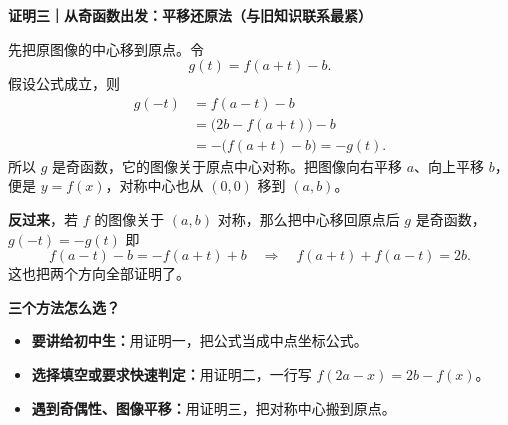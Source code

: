 \begin{proofbox}
\textbf{\textcolor{CProof}{证明三｜从奇函数出发：平移还原法（与旧知识联系最紧）}}



先把原图像的中心移到原点。令
\[
 g(t)=f(a+t)-b.
\]
假设公式成立，则
\[
\begin{aligned}
 g(-t)&=f(a-t)-b\\
      &=\bigl(2b-f(a+t)\bigr)-b\\
      &=-\bigl(f(a+t)-b\bigr)=-g(t).
\end{aligned}
\]
所以 $g$ 是奇函数，它的图像关于原点中心对称。把图像向右平移 $a$、向上平移 $b$，
便是 $y=f(x)$，对称中心也从 $(0,0)$ 移到 $(a,b)$。

\textbf{反过来}，若 $f$ 的图像关于 $(a,b)$ 对称，那么把中心移回原点后 $g$ 是奇函数，
$g(-t)=-g(t)$ 即
\[
 f(a-t)-b=-f(a+t)+b
\quad\Longrightarrow\quad
 f(a+t)+f(a-t)=2b.
\]
这也把两个方向全部证明了。

\medskip
\textbf{\textcolor{CProof}{三个方法怎么选？}}
\begin{itemize}[leftmargin=*,itemsep=0.25em]
\item \textbf{要讲给初中生：}用证明一，把公式当成中点坐标公式。
\item \textbf{选择填空或要求快速判定：}用证明二，一行写 $f(2a-x)=2b-f(x)$。
\item \textbf{遇到奇偶性、图像平移：}用证明三，把对称中心搬到原点。
\end{itemize}
\end{proofbox}
